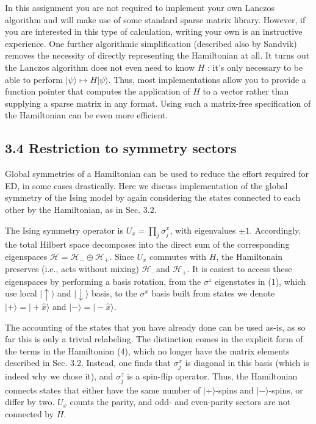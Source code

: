 \documentclass[10pt]{article}
\begin{document}
In this assignment you are not required to implement your own Lanczos algorithm and will make use of some standard sparse matrix library. However, if you are interested in this type of calculation, writing your own is an instructive experience. One further algorithmic simplification (described also by Sandvik) removes the necessity of directly representing the Hamiltonian at all. It turns out the Lanczos algorithm does not even need to know $H$ : it's only necessary to be able to perform $|\psi\rangle \mapsto H|\psi\rangle$. Thus, most implementations allow you to provide a function pointer that computes the application of $H$ to a vector rather than supplying a sparse matrix in any format. Using such a matrix-free specification of the Hamiltonian can be even more efficient.

\subsection*{3.4 Restriction to symmetry sectors}
Global symmetries of a Hamiltonian can be used to reduce the effort required for ED, in some cases drastically. Here we discuss implementation of the global symmetry of the Ising model by again considering the states connected to each other by the Hamiltonian, as in Sec. 3.2.

The Ising symmetry operator is $U_{x}=\prod_{j} \sigma_{j}^{x}$, with eigenvalues $\pm 1$. Accordingly, the total Hilbert space decomposes into the direct sum of the corresponding eigenspaces $\mathcal{H}=\mathcal{H}_{-} \oplus \mathcal{H}_{+}$. Since $U_{x}$ commutes with $H$, the Hamiltonain preserves (i.e., acts without mixing) $\mathcal{H}_{-}$and $\mathcal{H}_{+}$. It is easiest to access these eigenspaces by performing a basis rotation, from the $\sigma^{z}$ eigenstates in (1), which use local $|\uparrow\rangle$ and $|\downarrow\rangle$ basis, to the $\sigma^{x}$ basis built from states we denote $|+\rangle=|+\hat{x}\rangle$ and $|-\rangle=|-\hat{x}\rangle$.

The accounting of the states that you have already done can be used as-is, as so far this is only a trivial relabeling. The distinction comes in the explicit form of the terms in the Hamiltonian (4), which no longer have the matrix elements described in Sec. 3.2. Instead, one finds that $\sigma_{j}^{x}$ is diagonal in this basis (which is indeed why we chose it), and $\sigma_{j}^{z}$ is a spin-flip operator. Thus, the Hamiltonian connects states that either have the same number of $|+\rangle$-spins and $|-\rangle$-spins, or differ by two. $U_{x}$ counts the parity, and odd- and even-parity sectors are not connected by $H$.
\end{document}
